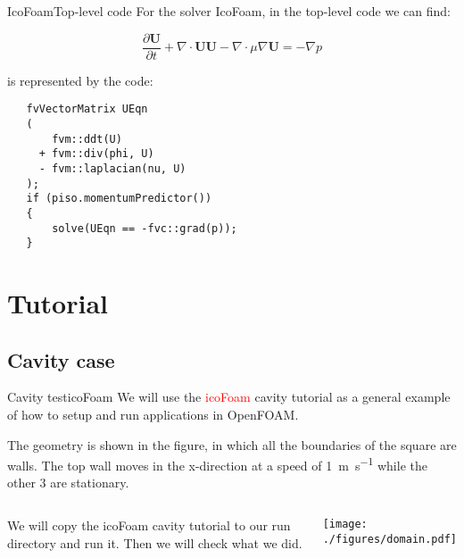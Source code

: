 \documentclass{beamer}
\begin{document}
\begin{frame}[fragile]{IcoFoam}{Top-level code}
For the solver IcoFoam, in the top-level code we can find:

$$
\frac{\partial\mathbf{U}}{\partial t} + \nabla\cdot \mathbf{U} \mathbf{U} - \nabla\cdot \mu\nabla \mathbf{U} = -\nabla  p
$$

is represented by the code:\\[0.4cm]

\begin{lrbox}{\mybox}
  \begin{minipage}{20em}
\begin{small}
\begin{verbatim}
   fvVectorMatrix UEqn
   (
       fvm::ddt(U)
     + fvm::div(phi, U)
     - fvm::laplacian(nu, U)
   );
   if (piso.momentumPredictor())
   {
       solve(UEqn == -fvc::grad(p));
   }
\end{verbatim}
\end{small}
  \end{minipage}
\end{lrbox}

\fbox{\usebox\mybox}

\end{frame}

\section{Tutorial}
\subsection{Cavity case}

\begin{frame}{Cavity test}{icoFoam}
We will use the \textcolor{red}{icoFoam} cavity tutorial as a general example of how to setup and run applications in OpenFOAM.

The geometry is shown in the figure, in which all the boundaries of the square are walls. The top wall moves in the x-direction at a speed of \SI{1}{\m\per\s} while the other 3 are stationary. 
\vspace{-0.2cm}
\begin{columns}[c]

\column{4.0cm} 

We will copy the icoFoam cavity tutorial to our run directory and run it. Then we will check what we did.



\column{7.5cm} 
\begin{center}\texttt{[image: ./figures/domain.pdf]}\end{center}
\end{columns}

\end{frame}
\end{document}
